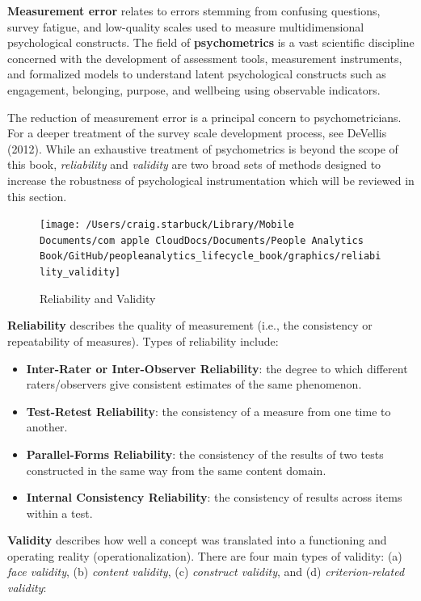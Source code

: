 \documentclass[]{book}
\providecommand{\tightlist}{%
  \setlength{\itemsep}{0pt}\setlength{\parskip}{0pt}}
\begin{document}
\textbf{Measurement error} relates to errors stemming from confusing questions, survey fatigue, and low-quality scales used to measure multidimensional psychological constructs. The field of \textbf{psychometrics} is a vast scientific discipline concerned with the development of assessment tools, measurement instruments, and formalized models to understand latent psychological constructs such as engagement, belonging, purpose, and wellbeing using observable indicators.

The reduction of measurement error is a principal concern to psychometricians. For a deeper treatment of the survey scale development process, see DeVellis (2012). While an exhaustive treatment of psychometrics is beyond the scope of this book, \emph{reliability} and \emph{validity} are two broad sets of methods designed to increase the robustness of psychological instrumentation which will be reviewed in this section.

\begin{figure}

{\centering \texttt{[image: /Users/craig.starbuck/Library/Mobile Documents/com~apple~CloudDocs/Documents/People Analytics Book/GitHub/peopleanalytics\_lifecycle\_book/graphics/reliability\_validity]} 

}

\caption{Reliability and Validity}\label{fig:reli-vali}
\end{figure}

\textbf{Reliability} describes the quality of measurement (i.e., the consistency or repeatability of measures). Types of reliability include:

\begin{itemize}
\tightlist
\item
  \textbf{Inter-Rater or Inter-Observer Reliability}: the degree to which different raters/observers give consistent estimates of the same phenomenon.
\item
  \textbf{Test-Retest Reliability}: the consistency of a measure from one time to another.
\item
  \textbf{Parallel-Forms Reliability}: the consistency of the results of two tests constructed in the same way from the same content domain.
\item
  \textbf{Internal Consistency Reliability}: the consistency of results across items within a test.
\end{itemize}

\textbf{Validity} describes how well a concept was translated into a functioning and operating reality (operationalization). There are four main types of validity: (a) \emph{face validity}, (b) \emph{content validity}, (c) \emph{construct validity}, and (d) \emph{criterion-related validity}:
\end{document}
